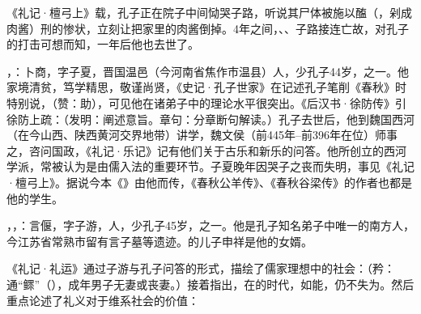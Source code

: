 《礼记·檀弓上》载，孔子正在院子中间恸哭子路，听说其尸体被施以醢（，剁成肉酱）刑的惨状，立刻让把家里的肉酱倒掉。4年之间，、、子路接连亡故，对孔子的打击可想而知，一年后他也去世了。

，：卜商，字子夏，晋国温邑（今河南省焦作市温县）人，少孔子44岁，之一。他家境清贫，笃学精思，敬谨尚贤，《史记·孔子世家》在记述孔子笔削《春秋》时特别说，（赞：助），可见他在诸弟子中的理论水平很突出。《后汉书·徐防传》引徐防上疏：（发明：阐述意旨。章句：分章断句解读。）孔子去世后，他到魏国西河（在今山西、陕西黄河交界地带）讲学，魏文侯（前445年--前396年在位）师事之，咨问国政，《礼记·乐记》记有他们关于古乐和新乐的问答。他所创立的西河学派，常被认为是由儒入法的重要环节。子夏晚年因哭子之丧而失明，事见《礼记·檀弓上》。据说今本《》由他而传，《春秋公羊传》、《春秋谷梁传》的作者也都是他的学生。

，，：言偃，字子游，人，少孔子45岁，之一。他是孔子知名弟子中唯一的南方人，今江苏省常熟市留有言子墓等遗迹。的儿子申祥是他的女婿。

《礼记·礼运》通过子游与孔子问答的形式，描绘了儒家理想中的社会：（矜：通“鳏”（），成年男子无妻或丧妻。）接着指出，在的时代，如能，仍不失为。然后重点论述了礼义对于维系社会的价值：

